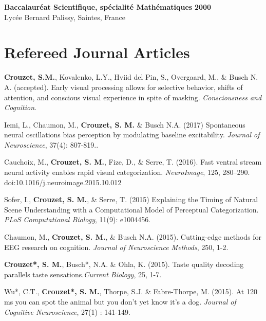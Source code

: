 \documentclass[margin,line]{resume}
\begin{document}
\begin{resume}
	\textbf{Baccalauréat Scientifique, spécialité Mathématiques} \hfill \textbf{2000}\\
	Lycée Bernard Palissy, Saintes, France


	\vspace{3mm}	
    \section{\mysidestyle Refereed Journal Articles}
	\textbf{Crouzet, S.M.}, Kovalenko, L.Y., Hviid del Pin, S., Overgaard, M., \& Busch N. A. (accepted). Early visual processing allows for selective behavior, shifts of attention, and conscious visual experience in spite of masking. \textit{Consciousness and Cognition}.
	
	\vspace{-2mm}  Iemi, L., Chaumon, M., \textbf{Crouzet, S. M.} \& Busch N.A. (2017) Spontaneous neural oscillations bias perception by modulating baseline excitability. \textit{Journal of Neuroscience}, 37(4): 807-819..

    	\vspace{-2mm} Cauchoix, M., \textbf{Crouzet, S. M.}, Fize, D., \& Serre, T. (2016). Fast ventral stream neural activity enables rapid visual categorization. \textit{NeuroImage}, 125, 280–290. doi:10.1016/j.neuroimage.2015.10.012

	\vspace{-2mm} Sofer, I., \textbf{Crouzet, S. M.}, \& Serre, T. (2015) Explaining the Timing of Natural Scene Understanding with a Computational Model of Perceptual Categorization. \textit{PLoS Computational Biology}, 11(9): e1004456.

	\vspace{-2mm} Chaumon, M., \textbf{Crouzet, S. M.}, \& Busch N.A. (2015). Cutting-edge methods for EEG research on cognition. \textit{Journal of Neuroscience Methods}, 250, 1-2.

  	\newpage
	
	\vspace{-2mm}  \textbf{Crouzet*, S. M.}, Busch*, N.A. \& Ohla, K. (2015). Taste quality decoding parallels taste sensations.\textit{Current Biology}, 25, 1-7.
		
	\vspace{-2mm}  Wu*, C.T.,  \textbf{Crouzet*, S. M.}, Thorpe, S.J. \& Fabre-Thorpe, M. (2015). At 120 ms you can spot the animal but you don't yet know it's a dog. \textit{Journal of Cognitive Neuroscience},  27(1) : 141-149.
			

\end{resume}
\end{document}

